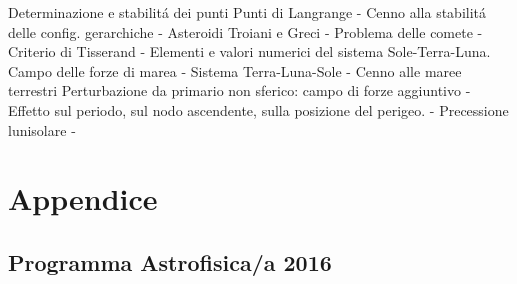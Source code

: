 Determinazione e stabilit\'a dei punti Punti di Langrange - Cenno alla stabilit\'a delle config. gerarchiche - Asteroidi Troiani e Greci - Problema delle comete - Criterio di Tisserand - Elementi e valori numerici del sistema Sole-Terra-Luna.
Campo delle forze di marea - Sistema Terra-Luna-Sole - Cenno alle maree terrestri
Perturbazione da primario non sferico: campo di forze aggiuntivo - Effetto sul periodo, sul nodo ascendente, sulla posizione del perigeo. - Precessione lunisolare - 


\stopcontents[chapters]


\backmatter

\part{Appendice}

\chapter{Programma Astrofisica/a 2016}

